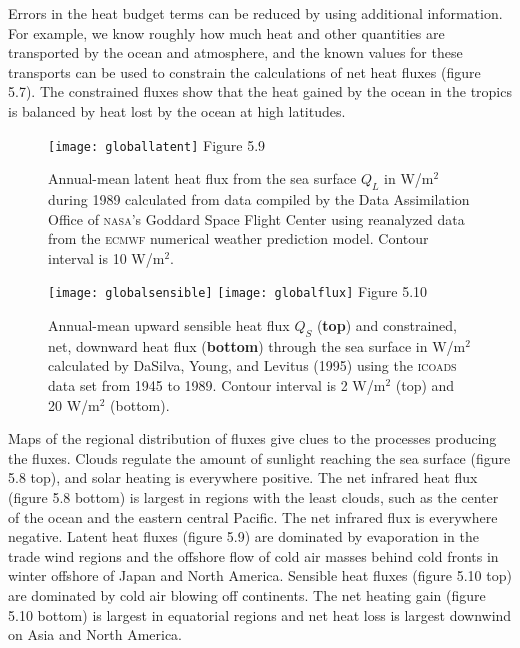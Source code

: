 Errors in the heat budget terms can be reduced by using additional information. For example, we know roughly how much heat and other quantities are transported by the ocean and atmosphere, and the known values for these transports can be used to constrain the calculations of net heat fluxes (figure 5.7). The constrained fluxes show that the heat gained by
the ocean in the tropics is balanced by heat lost by the ocean at high latitudes.

\begin{figure}[t!]
\texttt{[image: globallatent]}
\footnotesize
Figure 5.9 \rule{0mm}{3ex}Annual-mean latent heat
flux from the sea surface $Q_{L}$ in W/m$^2$ during 1989
calculated from data compiled by the Data Assimilation Office of
\textsc{nasa}'s Goddard Space Flight Center using reanalyzed data from the \textsc{ecmwf}
numerical weather prediction model. Contour interval is 10 W/m$^2$.
\label{fig:globallatent}
\vspace{-3ex}
\end{figure}

\begin{figure}[t!]
\texttt{[image: globalsensible]}
\texttt{[image: globalflux]}
\footnotesize
Figure 5.10 \rule{0mm}{3ex}Annual-mean upward sensible heat flux
$Q_{S}$ (\textbf{top}) and constrained, net, downward heat flux (\textbf{bottom})
through the sea surface in W/m$^2$ calculated by DaSilva, Young, and Levitus
(1995) using the \textsc{icoads} data set from 1945 to 1989. Contour interval is 2
W/m$^2$ (top) and 20  W/m$^2$ (bottom).
\label{fig:globalsensible}
\vspace{-5ex}
\end{figure}

Maps of the regional distribution of fluxes give clues to the processes
producing the fluxes. Clouds regulate the amount of sunlight reaching the sea
surface (figure 5.8 top), and solar heating is everywhere positive.
The net infrared heat flux (figure 5.8 bottom) is largest in regions with
the least clouds, such as the center of the ocean and the eastern central Pacific. The
net infrared flux is everywhere negative. Latent heat fluxes (figure 5.9) are
dominated by evaporation in the trade wind regions and the offshore flow of cold
air masses behind cold fronts in winter offshore of Japan and North America.
Sensible heat fluxes (figure 5.10 top) are dominated by cold air blowing off
continents. The net heating gain (figure 5.10 bottom) is largest in equatorial
regions and net heat loss is largest downwind on Asia and North America.

